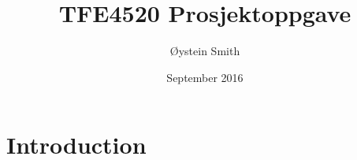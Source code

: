 \documentclass{article}
\title{TFE4520 Prosjektoppgave}
\author{Øystein Smith}
\date{September 2016}
\begin{document}
\maketitle

\section{Introduction}
\end{document}
